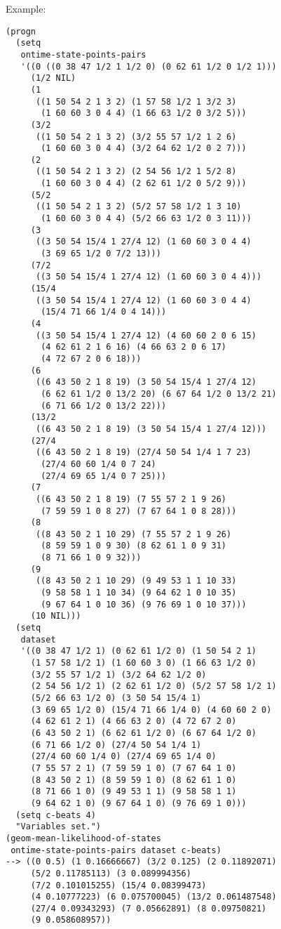\vspace{0.5cm}
\noindent Example:
\begin{verbatim}
(progn
  (setq
   ontime-state-points-pairs
   '((0 ((0 38 47 1/2 1 1/2 0) (0 62 61 1/2 0 1/2 1)))
     (1/2 NIL)
     (1
      ((1 50 54 2 1 3 2) (1 57 58 1/2 1 3/2 3)
       (1 60 60 3 0 4 4) (1 66 63 1/2 0 3/2 5)))
     (3/2
      ((1 50 54 2 1 3 2) (3/2 55 57 1/2 1 2 6)
       (1 60 60 3 0 4 4) (3/2 64 62 1/2 0 2 7)))
     (2
      ((1 50 54 2 1 3 2) (2 54 56 1/2 1 5/2 8)
       (1 60 60 3 0 4 4) (2 62 61 1/2 0 5/2 9)))
     (5/2
      ((1 50 54 2 1 3 2) (5/2 57 58 1/2 1 3 10)
       (1 60 60 3 0 4 4) (5/2 66 63 1/2 0 3 11)))
     (3
      ((3 50 54 15/4 1 27/4 12) (1 60 60 3 0 4 4)
       (3 69 65 1/2 0 7/2 13)))
     (7/2
      ((3 50 54 15/4 1 27/4 12) (1 60 60 3 0 4 4)))
     (15/4
      ((3 50 54 15/4 1 27/4 12) (1 60 60 3 0 4 4)
       (15/4 71 66 1/4 0 4 14)))
     (4
      ((3 50 54 15/4 1 27/4 12) (4 60 60 2 0 6 15)
       (4 62 61 2 1 6 16) (4 66 63 2 0 6 17)
       (4 72 67 2 0 6 18)))
     (6
      ((6 43 50 2 1 8 19) (3 50 54 15/4 1 27/4 12)
       (6 62 61 1/2 0 13/2 20) (6 67 64 1/2 0 13/2 21)
       (6 71 66 1/2 0 13/2 22)))
     (13/2
      ((6 43 50 2 1 8 19) (3 50 54 15/4 1 27/4 12)))
     (27/4
      ((6 43 50 2 1 8 19) (27/4 50 54 1/4 1 7 23)
       (27/4 60 60 1/4 0 7 24)
       (27/4 69 65 1/4 0 7 25)))
     (7
      ((6 43 50 2 1 8 19) (7 55 57 2 1 9 26)
       (7 59 59 1 0 8 27) (7 67 64 1 0 8 28)))
     (8
      ((8 43 50 2 1 10 29) (7 55 57 2 1 9 26)
       (8 59 59 1 0 9 30) (8 62 61 1 0 9 31)
       (8 71 66 1 0 9 32)))
     (9
      ((8 43 50 2 1 10 29) (9 49 53 1 1 10 33)
       (9 58 58 1 1 10 34) (9 64 62 1 0 10 35)
       (9 67 64 1 0 10 36) (9 76 69 1 0 10 37)))
     (10 NIL)))
  (setq
   dataset
   '((0 38 47 1/2 1) (0 62 61 1/2 0) (1 50 54 2 1)
     (1 57 58 1/2 1) (1 60 60 3 0) (1 66 63 1/2 0)
     (3/2 55 57 1/2 1) (3/2 64 62 1/2 0)
     (2 54 56 1/2 1) (2 62 61 1/2 0) (5/2 57 58 1/2 1)
     (5/2 66 63 1/2 0) (3 50 54 15/4 1)
     (3 69 65 1/2 0) (15/4 71 66 1/4 0) (4 60 60 2 0)
     (4 62 61 2 1) (4 66 63 2 0) (4 72 67 2 0)
     (6 43 50 2 1) (6 62 61 1/2 0) (6 67 64 1/2 0)
     (6 71 66 1/2 0) (27/4 50 54 1/4 1)
     (27/4 60 60 1/4 0) (27/4 69 65 1/4 0)
     (7 55 57 2 1) (7 59 59 1 0) (7 67 64 1 0)
     (8 43 50 2 1) (8 59 59 1 0) (8 62 61 1 0)
     (8 71 66 1 0) (9 49 53 1 1) (9 58 58 1 1)
     (9 64 62 1 0) (9 67 64 1 0) (9 76 69 1 0)))
  (setq c-beats 4)
  "Variables set.")
(geom-mean-likelihood-of-states
 ontime-state-points-pairs dataset c-beats)
--> ((0 0.5) (1 0.16666667) (3/2 0.125) (2 0.11892071)
     (5/2 0.11785113) (3 0.089994356)
     (7/2 0.101015255) (15/4 0.08399473)
     (4 0.10777223) (6 0.075700045) (13/2 0.061487548)
     (27/4 0.09343293) (7 0.05662891) (8 0.09750821)
     (9 0.058608957))
\end{verbatim}

